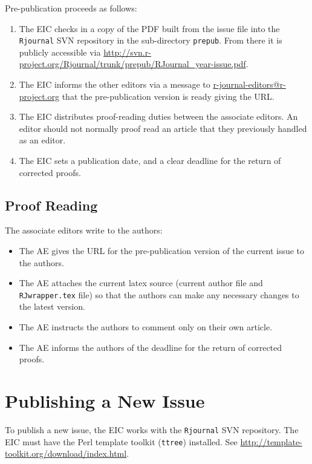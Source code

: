 \documentclass[11pt]{article}
\begin{document}
Pre-publication proceeds as follows:

\begin{enumerate}
\item The EIC checks in a copy of the PDF built from the issue file
  into the \texttt{Rjournal} SVN repository in the sub-directory
  \texttt{prepub}. From there it is publicly accessible via
  \url{http://svn.r-project.org/Rjournal/trunk/prepub/RJournal_year-issue.pdf}.
\item The EIC informs the other editors via a message to
  \url{r-journal-editors@r-project.org} that the pre-publication
  version is ready giving the URL.
\item The EIC distributes proof-reading duties between the associate
  editors. An editor should not normally proof read an article that
  they previously handled as an editor.
\item The EIC sets a publication date, and a clear deadline for the
  return of corrected proofs.
\end{enumerate}

\subsection{Proof Reading}

The associate editors write to the authors:
\begin{itemize}
\item The AE gives the URL for the pre-publication version of the
  current issue to the authors.
\item The AE attaches the current latex source (current author file
  and \texttt{RJwrapper.tex} file) so that the authors can make any
  necessary changes to the latest version.
\item The AE instructs the authors to comment only on their own article.
\item The AE informs the authors of the deadline for the return of
  corrected proofs.
\end{itemize}

\section{Publishing a New Issue}

To publish a new issue, the EIC works with the \texttt{Rjournal} SVN
repository. The EIC must have the Perl template toolkit
(\texttt{ttree}) installed. See
\url{http://template-toolkit.org/download/index.html}. 
\end{document}
